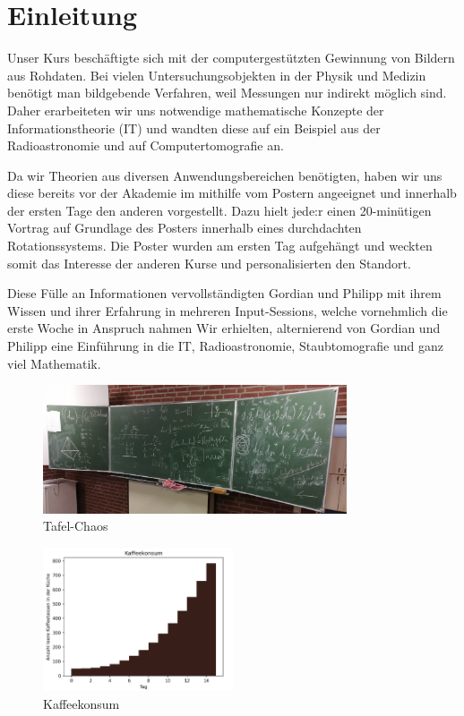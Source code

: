 \section{Einleitung}

Unser Kurs beschäftigte sich mit der computergestützten Gewinnung von Bildern aus Rohdaten.
Bei vielen Untersuchungsobjekten in der Physik und Medizin benötigt man bildgebende Verfahren, weil Messungen nur indirekt möglich sind.
Daher erarbeiteten wir uns notwendige mathematische Konzepte der Informationstheorie (IT) und wandten diese auf ein Beispiel aus der Radioastronomie und auf Computertomografie an.

Da wir Theorien aus diversen Anwendungsbereichen benötigten, haben wir uns diese bereits vor der Akademie im mithilfe vom Postern angeeignet und innerhalb der ersten Tage den anderen vorgestellt.
Dazu hielt jede:r einen 20-minütigen Vortrag auf Grundlage des Posters innerhalb eines durchdachten Rotationssystems.
Die Poster wurden am ersten Tag aufgehängt und weckten somit das Interesse der anderen Kurse und personalisierten den Standort.

Diese Fülle an Informationen vervollständigten Gordian und Philipp mit ihrem Wissen und ihrer Erfahrung in mehreren Input-Sessions, welche vornehmlich die erste Woche in Anspruch nahmen
Wir erhielten, alternierend von Gordian und Philipp eine Einführung in die IT, Radioastronomie, Staubtomografie und ganz viel Mathematik.

\begin{figure}
    \centering
    \includegraphics[width=0.8\textwidth]{k4.2/tafelbild.png}
    \caption{Tafel-Chaos}
\end{figure}


\begin{figure}
    \centering
	\includegraphics[width=0.5\textwidth]{k4.2/kaffee.png}
	\caption{Kaffeekonsum}
    \label{k4.2.fig.kaffee}
\end{figure}

